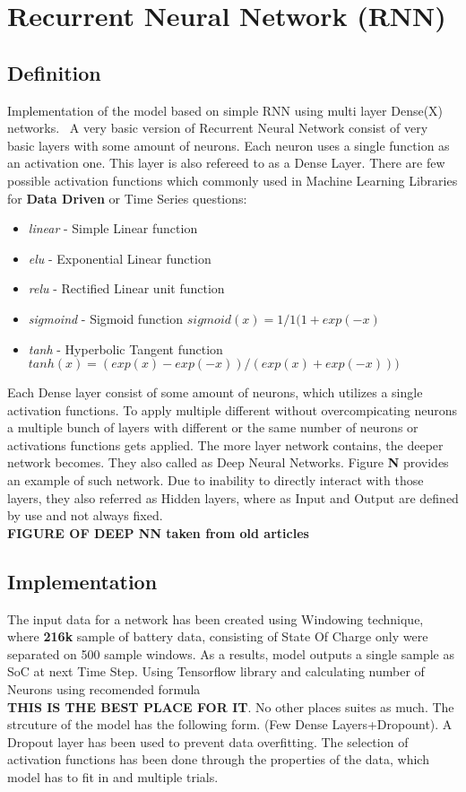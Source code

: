 \section{Recurrent Neural Network (RNN)}\label{sec:RNN}
\subsection{Definition}
    Implementation of the model based on simple RNN using multi layer Dense(X) networks.~\cite{lees2010theoretical}
    A very basic version of Recurrent Neural Network consist of very basic layers with some amount of neurons.
    Each neuron uses a single function as an activation one.
    This layer is also refereed to as a Dense Layer.
    There are few possible activation functions which commonly used in Machine Learning Libraries for \textbf{Data Driven} or Time Series questions:
    \begin{itemize}
        \item \textit{linear} - Simple Linear function
        \item \textit{elu} - Exponential Linear function
        \item \textit{relu} - Rectified Linear unit function
        \item \textit{sigmoind} - Sigmoid function $sigmoid(x) = 1/1(1+exp(-x)$
        \item \textit{tanh} - Hyperbolic Tangent function $tanh(x) = (exp(x)-exp(-x))/(exp(x)+exp(-x)))$
    \end{itemize}
    Each Dense layer consist of some amount of neurons, which utilizes a single activation functions.
    To apply multiple different without overcompicating neurons a multiple bunch of layers with different or the same number of neurons or activations functions gets applied. The more layer network contains, the deeper network becomes. They also called as Deep Neural Networks.
    Figure \textbf{N} provides an example of such network.
    Due to inability to directly interact with those layers, they also referred as Hidden layers, where as Input and Output are defined by use and not always fixed. \\
    \textbf{FIGURE OF DEEP NN taken from old articles}
\subsection{Implementation}
    The input data for a network has been created using Windowing technique, where \textbf{216k} sample of battery data, consisting of State Of Charge only were separated on 500 sample windows.
    As a results, model outputs a single sample as SoC at next Time Step. Using Tensorflow library and calculating number of Neurons using recomended formula \\
    \textbf{THIS IS THE BEST PLACE FOR IT}. No other places suites as much.
    The strcuture of the model has the following form. (Few Dense Layers+Dropount).
    A Dropout layer has been used to prevent data overfitting. The selection of activation functions has been done through the properties of the data, which model has to fit in and multiple trials.

